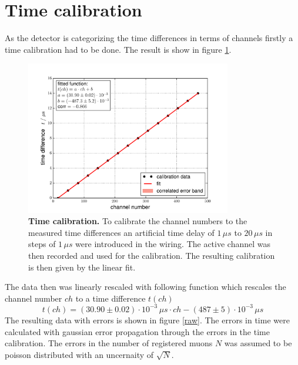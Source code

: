 \documentclass{include/thesisclass3}
\newcommand{\cc}{\cdot}
\newcommand{\e}[1]{\,\si{#1}}
\begin{document}
\section{Time calibration}
As the detector is categorizing the time differences in terms of channels firstly a time calibration had to be done.
The result is show in figure \ref{time}.

\begin{figure}[H]
\centering
\includegraphics[width = 0.8\textwidth]{images/cali_fit.pdf}
\caption{\label{time}\textbf{Time calibration.} To calibrate the channel numbers to the measured time differences an artificial time delay of $1\e{\mu s}$ to $20\e{\mu s}$ in steps of $1\e{\mu s}$ were introduced in the wiring. The active channel was then recorded and used for the calibration. The resulting calibration is then given by the linear fit.}
\end{figure}
The data then was linearly rescaled with following function which rescales the channel number $ch$ to a time difference $t(ch)$
\[ t(ch) = (30.90 \pm 0.02)\cc 10^{-3} \e{\mu s} \cc ch - ( 487 \pm 5) \cc 10^{-3} \e{\mu s}\]
The resulting data with errors is shown in figure \ref{raw}. The errors in time were calculated with gaussian error propagation through the errors in the time calibration. The errors in the number of registered muons $N$ was assumed to be poisson distributed with an uncernaity of $\sqrt{N}$.
\end{document}
